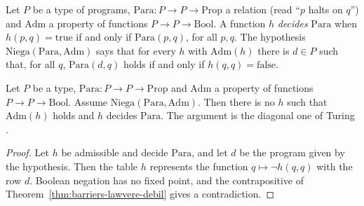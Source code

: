 \begin{definition}
  \label{def:barriers-niega}
  \leanok
  Let $P$ be a type of programs, $\mathrm{Para} : P \to P \to \mathrm{Prop}$ a relation (read ``$p$
  halts on $q$'') and $\mathrm{Adm}$ a property of functions $P \to P \to \mathrm{Bool}$. A function
  $h$ \emph{decides} $\mathrm{Para}$ when $h(p, q) = \mathrm{true}$ if and only if
  $\mathrm{Para}(p, q)$, for all $p, q$. The hypothesis $\mathrm{Niega}(\mathrm{Para},
  \mathrm{Adm})$ says that for every $h$ with $\mathrm{Adm}(h)$ there is $d \in P$ such that, for
  all $q$, $\mathrm{Para}(d, q)$ holds if and only if $h(q, q) = \mathrm{false}$.
  \own{}
\end{definition}

\begin{theorem}
  \label{thm:barriers-parada-indecidible}
  \leanok
  Let $P$ be a type, $\mathrm{Para} : P \to P \to \mathrm{Prop}$ and $\mathrm{Adm}$ a property of
  functions $P \to P \to \mathrm{Bool}$. Assume $\mathrm{Niega}(\mathrm{Para}, \mathrm{Adm})$. Then
  there is no $h$ such that $\mathrm{Adm}(h)$ holds and $h$ decides $\mathrm{Para}$. The argument
  is the diagonal one of Turing \cite{Turing36}.
  \own{}
\end{theorem}

\begin{proof}
  \leanok
  Let $h$ be admissible and decide $\mathrm{Para}$, and let $d$ be the program given by the
  hypothesis. Then the table $h$ represents the function $q \mapsto \neg h(q, q)$ with the row $d$.
  Boolean negation has no fixed point, and the contrapositive of
  Theorem~\ref{thm:barriers-lawvere-debil} gives a contradiction.
\end{proof}


